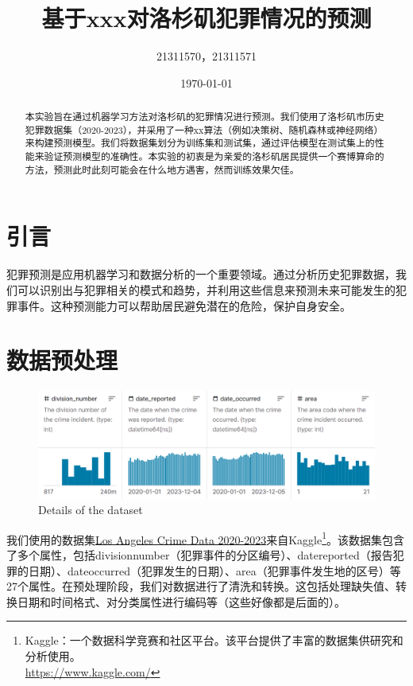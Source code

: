 \documentclass{article}
\begin{document}
\title{基于xxx对洛杉矶犯罪情况的预测}
\author{21311570，21311571}
\date{\today}

\maketitle

\renewcommand{\abstractname}{摘要}  %

\begin{abstract}
    本实验旨在通过机器学习方法对洛杉矶的犯罪情况进行预测。我们使用了洛杉矶市历史犯罪数据集（2020-2023），并采用了一种xx算法（例如决策树、随机森林或神经网络）来构建预测模型。我们将数据集划分为训练集和测试集，通过评估模型在测试集上的性能来验证预测模型的准确性。本实验的初衷是为亲爱的洛杉矶居民提供一个赛博算命的方法，预测此时此刻可能会在什么地方遇害，然而训练效果欠佳。
\end{abstract}

\section{引言}
犯罪预测是应用机器学习和数据分析的一个重要领域。通过分析历史犯罪数据，我们可以识别出与犯罪相关的模式和趋势，并利用这些信息来预测未来可能发生的犯罪事件。这种预测能力可以帮助居民避免潜在的危险，保护自身安全。

\section{数据预处理}

\begin{figure}
    \centering
    \includegraphics[width=1\textwidth]{../pic/Screenshot 2024-01-12 111029.png}
    \caption{Details of the dataset}
    \label{fig:Details}
\end{figure}


我们使用的数据集\href{https://www.kaggle.com/datasets/asaniczka/crimes-in-los-angeles-2020-2023/data}{Los Angeles Crime Data 2020-2023}来自Kaggle\footnote{Kaggle：一个数据科学竞赛和社区平台。该平台提供了丰富的数据集供研究和分析使用。\\\url{https://www.kaggle.com/}}。该数据集包含了多个属性，包括division\textunderscore{}number（犯罪事件的分区编号）、date\textunderscore{}reported（报告犯罪的日期）、date\textunderscore{}occurred（犯罪发生的日期）、area（犯罪事件发生地的区号）等27个属性。在预处理阶段，我们对数据进行了清洗和转换。这包括处理缺失值、转换日期和时间格式、对分类属性进行编码等（这些好像都是后面的）。
\end{document}
